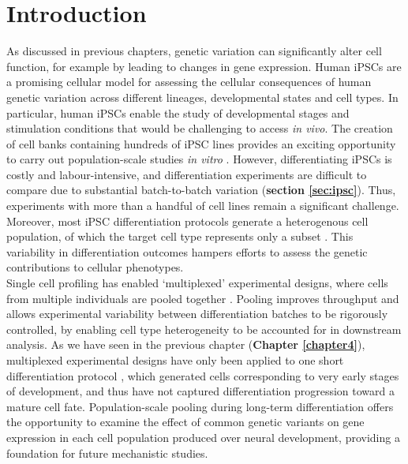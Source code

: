 \newpage

\section{Introduction}
\label{sec:neuroseq_intro}

As discussed in previous chapters, genetic variation can significantly alter cell function, for example by leading to changes in gene expression. 
Human iPSCs are a promising cellular model for assessing the cellular consequences of human genetic variation across different lineages, developmental states and cell types. 
In particular, human iPSCs enable the study of developmental stages and stimulation conditions that would be challenging to access \textit{in vivo}. 
The creation of cell banks containing hundreds of iPSC lines \cite{kilpinen2017common} provides an exciting opportunity to carry out population-scale studies \textit{in vitro} \cite{cuomo2020single, strober2019dynamic, schwartzentruber2018molecular, alasoo2018shared}.
However, differentiating iPSCs is costly and labour-intensive, and differentiation experiments are difficult to compare due to substantial batch-to-batch variation (\textbf{section \ref{sec:ipsc}}).
Thus, experiments with more than a handful of cell lines remain a significant challenge.
Moreover, most iPSC differentiation protocols generate a heterogenous cell population, of which the target cell type represents only a subset \cite{d2019vitro, banovich2018impact, volpato2018reproducibility, nguyen2018single}. 
This variability in differentiation outcomes hampers efforts to assess the genetic contributions to cellular phenotypes.\\

Single cell profiling has enabled `multiplexed' experimental designs, where cells from multiple individuals are pooled together \cite{cuomo2020single, nguyen2018single}. 
Pooling improves throughput and allows experimental variability between differentiation batches to be rigorously controlled, by enabling cell type heterogeneity to be accounted for in downstream analysis. 
As we have seen in the previous chapter (\textbf{Chapter \ref{chapter4}}), multiplexed experimental designs have only been applied to one short differentiation protocol \cite{cuomo2020single}, which generated cells corresponding to very early stages of development, and thus have not captured differentiation progression toward a mature cell fate. 
Population-scale pooling during long-term differentiation offers the opportunity to examine the effect of common genetic variants on gene expression in each cell population produced over neural development, providing a foundation for future mechanistic studies.\\

